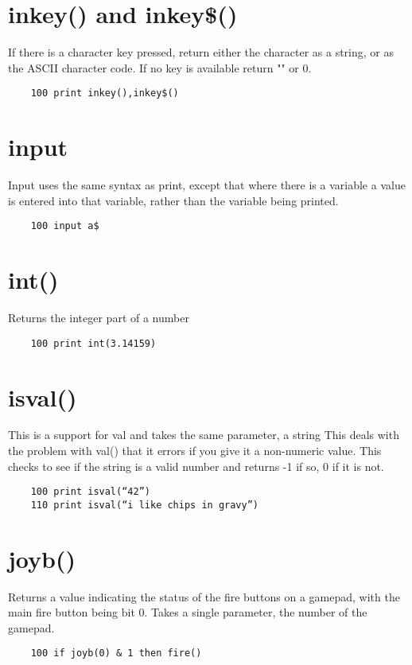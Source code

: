 \section*{inkey() and inkey\$()}
If there is a character key pressed, return either the character as a string, or as the ASCII character code. If no key is available return "" or 0.
\example{}
\begin{verbatim}
	100 print inkey(),inkey$()
\end{verbatim}

\section*{input}
Input uses the same syntax as print, except that where there is a variable a value is entered into that variable, rather than the variable being printed.
\example{}
\begin{verbatim}
	100 input a$
\end{verbatim}

\section*{int()}
Returns the integer part of a number
\example{}
\begin{verbatim}
	100 print int(3.14159)
\end{verbatim}

\section*{isval()}
This is a support for val and takes the same parameter, a string  This deals with the problem with val() that it errors if you give it a non-numeric value. This checks to see if the string is a valid number  and returns -1 if so, 0 if it is not.
\example{}
\begin{verbatim}
	100 print isval(“42”)
	110 print isval(“i like chips in gravy”)
\end{verbatim}

\section*{joyb()}
Returns a value indicating the status of the fire buttons on a gamepad, with the main fire button being bit 0. Takes a single parameter, the number of the gamepad.
\example{}
\begin{verbatim}
	100 if joyb(0) & 1 then fire()
\end{verbatim}

